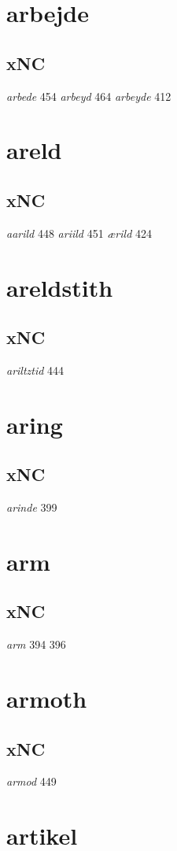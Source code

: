 \documentclass[a4paper,twocolumn]{article}
\begin{document}
\section{arbejde}
\label{sec:orgc8543f0}
\subsection{xNC}
\label{sec:org8a6cc72}
\emph{arbede} 454 \emph{arbeyd} 464 \emph{arbeyde} 412 
\section{areld}
\label{sec:org9cd843a}
\subsection{xNC}
\label{sec:orga8f678d}
\emph{aarild} 448 \emph{ariild} 451 \emph{ærild} 424 
\section{areldstith}
\label{sec:orgd9dcfd3}
\subsection{xNC}
\label{sec:orgf0010fb}
\emph{ariltztid} 444 
\section{aring}
\label{sec:org802561c}
\subsection{xNC}
\label{sec:org32437f0}
\emph{arinde} 399 
\section{arm}
\label{sec:org7c875d6}
\subsection{xNC}
\label{sec:org2c9cd6f}
\emph{arm} 394 396 
\section{armoth}
\label{sec:org66b4556}
\subsection{xNC}
\label{sec:org15dd55f}
\emph{armod} 449 
\section{artikel}
\label{sec:org303e5cd}
\end{document}
